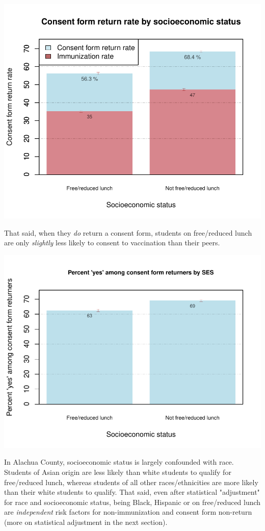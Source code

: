 \documentclass{article}
\begin{document}
\begin{multicols}{2}
\begin{multicols}{2}
\begin{center}
\includegraphics{superintendent-006}
\end{center}

That said, when they \emph{do} return a consent form, students on free/reduced lunch are only \emph{slightly} less likely to consent to vaccination than their peers.  

\begin{center}
\includegraphics{superintendent-007}
\end{center}

In Alachua County, socioeconomic status is largely confounded with race. Students of Asian origin are less likely than white students to qualify for free/reduced lunch, whereas students of all other races/ethnicities are more likely than their white students to qualify. That said, even after statistical "adjustment" for race and socioeconomic status, being Black, Hispanic or on free/reduced lunch are \emph{independent} risk factors for non-immunization and consent form non-return (more on statistical adjustment in the next section).



\end{multicols}
\end{multicols}
\end{document}
